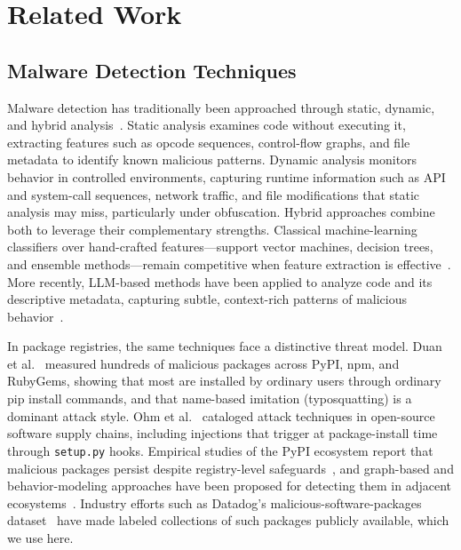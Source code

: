 \section{Related Work}
\label{sec:related-work}

\subsection{Malware Detection Techniques}
\label{sec:malware-techniques}

Malware detection has traditionally been approached through static,
dynamic, and hybrid analysis~\cite{singh2021survey}. Static analysis
examines code without executing it, extracting features such as opcode
sequences, control-flow graphs, and file metadata to identify known
malicious patterns. Dynamic analysis monitors behavior in controlled
environments, capturing runtime information such as API and system-call
sequences, network traffic, and file modifications that static analysis may
miss, particularly under obfuscation. Hybrid approaches combine both to
leverage their complementary strengths. Classical machine-learning
classifiers over hand-crafted features---support vector machines, decision
trees, and ensemble methods---remain competitive when feature extraction is
effective~\cite{singh2021survey}. More recently, LLM-based methods have been
applied to analyze code and its descriptive metadata, capturing subtle,
context-rich patterns of malicious behavior~\cite{ease2025rag}.

In package registries, the same techniques face a distinctive threat model.
Duan et al.~\cite{duan2021supply} measured hundreds of malicious packages
across PyPI, npm, and RubyGems, showing that most are installed by ordinary
users through ordinary pip install commands, and that
name-based imitation (typosquatting) is a dominant attack style.
Ohm et al.~\cite{ohm2020backstabber} cataloged attack techniques in
open-source software supply chains, including injections that trigger at
package-install time through \texttt{setup.py} hooks. Empirical studies of
the PyPI ecosystem report that malicious packages persist despite
registry-level safeguards~\cite{guo2023pypi, liang2021malicious}, and
graph-based and behavior-modeling approaches have been proposed for
detecting them in adjacent ecosystems~\cite{huang2024spiderscan}. Industry
efforts such as Datadog's malicious-software-packages
dataset~\cite{datadog-dataset} have made labeled collections of such
packages publicly available, which we use here.

